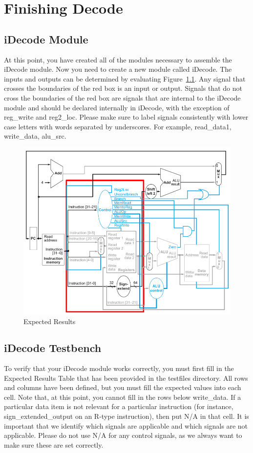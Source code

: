 \chapter{Finishing Decode}

\section{iDecode Module}
At this point, you have created all of the modules necessary to assemble the iDecode module.  Now you need to create a new module called iDecode.  The inputs and outputs can be determined by evaluating Figure~\ref{fig:decode_stage}.  Any signal that crosses the boundaries of the red box is an input or output.  Signals that do not cross the boundaries of the red box are signals that are internal to the iDecode module and should be declared internally in iDecode, with the exception of reg\_write and reg2\_loc.  Please make sure to label signals consistently with lower case letters with words separated by underscores.  For example, read\_data1, write\_data, alu\_src.

\begin{figure}
	\caption{Expected Results}\label{fig:decode_stage}
	\begin{center}
		\includegraphics[width=4.75in]{../images/decode_stage.png}
	\end{center}
\end{figure} 


\section{iDecode Testbench}
To verify that your iDecode module works correctly, you must first fill in the Expected Results Table that has been provided in the testfiles directory. All rows and columns have been defined, but you must fill the expected values into each cell.  Note that, at this point, you cannot fill in the rows below write\_data.  If a particular data item is not relevant for a particular instruction (for instance, sign\_extended\_output on an R-type instruction), then put N/A in that cell.  It is important that we identify which signals are applicable and which signals are not applicable.  Please do not use N/A for any control signals, as we always want to make sure these are set correctly.  


